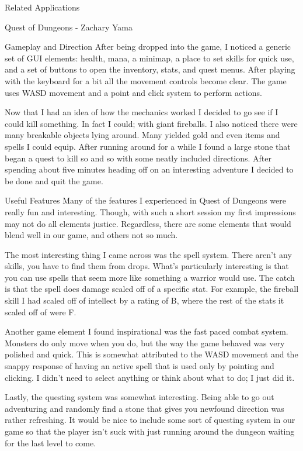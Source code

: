 \documentclass[12pt]{report}
\begin{document}
\begin{section}{Related Applications}
\begin{subsection}{Quest of Dungeons - Zachary Yama}
\begin{subsubsection}{Gameplay and Direction}
After being dropped into the game, I noticed a generic set of GUI elements:
health, mana, a minimap, a place to set skills for quick use, and a set of
buttons to open the inventory, stats, and quest menus. After playing with
the keyboard for a bit all the movement controls become clear. The game
uses WASD movement and a point and click system to perform actions.
 
Now that I had an idea of how the mechanics worked I decided to go see if I
could kill something. In fact I could; with giant fireballs. I also noticed
there were many breakable objects lying around. Many yielded gold and even
items and spells I could equip. After running around for a while I found a
large stone that began a quest to kill so and so with some neatly included 
directions. After spending about five minutes heading off on an interesting
adventure I decided to be done and quit the game.
\end{subsubsection}
 
\begin{subsubsection}{Useful Features}
Many of the features I experienced in Quest of Dungeons were really fun and
interesting. Though, with such a short session my first impressions may not
do all elements justice. Regardless, there are some elements that would
blend well in our game, and others not so much.
 
The most interesting thing I came across was the spell system. There aren’t
any skills, you have to find them from drops. What’s particularly
interesting is that you can use spells that seem more like something a
warrior would use. The catch is that the spell does damage scaled off of a
specific stat. For example, the fireball skill I had scaled off of
intellect by a rating of B, where the rest of the stats it scaled off of
were F.
 
Another game element I found inspirational was the fast paced combat
system. Monsters do only move when you do, but the way the game behaved was
very polished and quick. This is somewhat attributed to the WASD movement
and the snappy response of having an active spell that is used only by
pointing and clicking. I didn’t need to select anything or think about what
to do; I just did it.

Lastly, the questing system was somewhat interesting. Being able to go out
adventuring and randomly find a stone that gives you newfound direction was
rather refreshing. It would be nice to include some sort of questing system
in our game so that the player isn’t suck with just running around the
dungeon waiting for the last level to come.  
\end{subsubsection}
 

\end{subsection}
\end{section}
\end{document}
